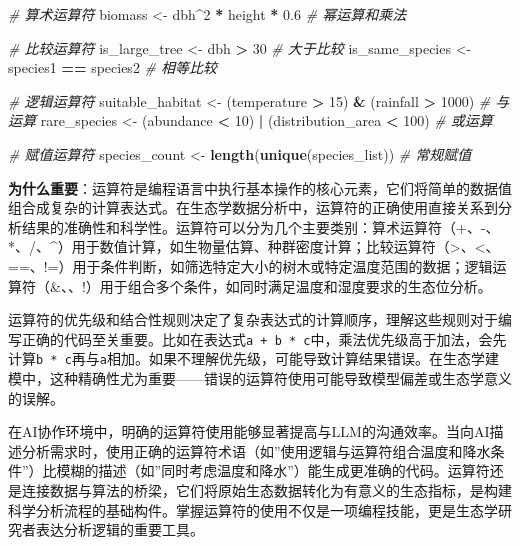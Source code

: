 \documentclass[
]{book}
\newenvironment{Shaded}{\begin{snugshade}}{\end{snugshade}}
\newcommand{\CommentTok}[1]{\textcolor[rgb]{0.56,0.35,0.01}{\textit{#1}}}
\newcommand{\DecValTok}[1]{\textcolor[rgb]{0.00,0.00,0.81}{#1}}
\newcommand{\FloatTok}[1]{\textcolor[rgb]{0.00,0.00,0.81}{#1}}
\newcommand{\FunctionTok}[1]{\textcolor[rgb]{0.13,0.29,0.53}{\textbf{#1}}}
\newcommand{\NormalTok}[1]{#1}
\newcommand{\OtherTok}[1]{\textcolor[rgb]{0.56,0.35,0.01}{#1}}
\newcommand{\SpecialCharTok}[1]{\textcolor[rgb]{0.81,0.36,0.00}{\textbf{#1}}}
\begin{document}
\begin{Shaded}
\begin{Highlighting}[]
\CommentTok{\# 算术运算符}
\NormalTok{biomass }\OtherTok{\textless{}{-}}\NormalTok{ dbh}\SpecialCharTok{\^{}}\DecValTok{2} \SpecialCharTok{*}\NormalTok{ height }\SpecialCharTok{*} \FloatTok{0.6}  \CommentTok{\# 幂运算和乘法}

\CommentTok{\# 比较运算符}
\NormalTok{is\_large\_tree }\OtherTok{\textless{}{-}}\NormalTok{ dbh }\SpecialCharTok{\textgreater{}} \DecValTok{30}  \CommentTok{\# 大于比较}
\NormalTok{is\_same\_species }\OtherTok{\textless{}{-}}\NormalTok{ species1 }\SpecialCharTok{==}\NormalTok{ species2  }\CommentTok{\# 相等比较}

\CommentTok{\# 逻辑运算符}
\NormalTok{suitable\_habitat }\OtherTok{\textless{}{-}}\NormalTok{ (temperature }\SpecialCharTok{\textgreater{}} \DecValTok{15}\NormalTok{) }\SpecialCharTok{\&}\NormalTok{ (rainfall }\SpecialCharTok{\textgreater{}} \DecValTok{1000}\NormalTok{)  }\CommentTok{\# 与运算}
\NormalTok{rare\_species }\OtherTok{\textless{}{-}}\NormalTok{ (abundance }\SpecialCharTok{\textless{}} \DecValTok{10}\NormalTok{) }\SpecialCharTok{|}\NormalTok{ (distribution\_area }\SpecialCharTok{\textless{}} \DecValTok{100}\NormalTok{)  }\CommentTok{\# 或运算}

\CommentTok{\# 赋值运算符}
\NormalTok{species\_count }\OtherTok{\textless{}{-}} \FunctionTok{length}\NormalTok{(}\FunctionTok{unique}\NormalTok{(species\_list))  }\CommentTok{\# 常规赋值}
\end{Highlighting}
\end{Shaded}

\textbf{为什么重要}：运算符是编程语言中执行基本操作的核心元素，它们将简单的数据值组合成复杂的计算表达式。在生态学数据分析中，运算符的正确使用直接关系到分析结果的准确性和科学性。运算符可以分为几个主要类别：算术运算符（+、-、*、/、\^{}）用于数值计算，如生物量估算、种群密度计算；比较运算符（\textgreater、\textless、==、!=）用于条件判断，如筛选特定大小的树木或特定温度范围的数据；逻辑运算符（\&、\textbar、!）用于组合多个条件，如同时满足温度和湿度要求的生态位分析。

运算符的优先级和结合性规则决定了复杂表达式的计算顺序，理解这些规则对于编写正确的代码至关重要。比如在表达式\texttt{a\ +\ b\ *\ c}中，乘法优先级高于加法，会先计算\texttt{b\ *\ c}再与\texttt{a}相加。如果不理解优先级，可能导致计算结果错误。在生态学建模中，这种精确性尤为重要------错误的运算符使用可能导致模型偏差或生态学意义的误解。

在AI协作环境中，明确的运算符使用能够显著提高与LLM的沟通效率。当向AI描述分析需求时，使用正确的运算符术语（如''使用逻辑与运算符组合温度和降水条件''）比模糊的描述（如''同时考虑温度和降水''）能生成更准确的代码。运算符还是连接数据与算法的桥梁，它们将原始生态数据转化为有意义的生态指标，是构建科学分析流程的基础构件。掌握运算符的使用不仅是一项编程技能，更是生态学研究者表达分析逻辑的重要工具。
\end{document}
